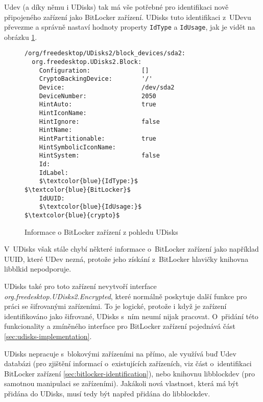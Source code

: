 Udev (a díky němu i UDisks) tak má vše potřebné pro identifikaci nově připojeného zařízení jako BitLocker zařízení. UDisks tuto identifikaci z~UDevu převezme a správně nastaví hodnoty property \texttt{IdType} a \texttt{IdUsage}, jak je vidět na obrázku \ref{fig:udisks-bitlocker-without-support}.

\begin{figure}[h]
		\centering
		\captionsetup{width=0.65\linewidth}
\begin{center}
\centering
\begin{lstlisting}[frame=none, escapechar=$, basicstyle=\ttfamily\small, columns=fullflexible, keepspaces=true, xleftmargin=.2\textwidth, xrightmargin=.2\textwidth]
/org/freedesktop/UDisks2/block_devices/sda2:
  org.freedesktop.UDisks2.Block:
    Configuration:              []
    CryptoBackingDevice:        '/'
    Device:                     /dev/sda2
    DeviceNumber:               2050
    HintAuto:                   true
    HintIconName:
    HintIgnore:                 false
    HintName:
    HintPartitionable:          true
    HintSymbolicIconName:
    HintSystem:                 false
    Id:
    IdLabel:
    $\textcolor{blue}{IdType:}$                     $\textcolor{blue}{BitLocker}$
    IdUUID:
    $\textcolor{blue}{IdUsage:}$                    $\textcolor{blue}{crypto}$
\end{lstlisting}
\end{center}
		\caption{Informace o BitLocker zařízení z pohledu UDisks}
		\label{fig:udisks-bitlocker-without-support}
\end{figure}

V~UDisks však stále chybí některé informace o~BitLocker zařízení jako například UUID, které UDev nezná, protože jeho získání z~BitLocker hlavičky knihovna libblkid nepodporuje.

UDisks také pro toto zařízení nevytvoří interface \emph{org.freedesktop.UDisks2.Encrypted}, které normálně poskytuje další funkce pro práci se šifrovanými zařízeními. To je logické, protože i když je zařízení identifikováno jako šifrované, UDisks s~ním neumí nijak pracovat. O~přidání této funkcionality a zmíněného interface pro BitLocker zařízení pojednává část \ref{sec:udisks-implementation}.

\label{sec:libblockdev}

UDisks nepracuje s~blokovými zařízeními na přímo, ale využívá buď Udev databázi (pro zjištění informací o~existujících zařízeních, viz část o~identifikaci BitLocker zařízení \ref{sec:bitlocker-identification}), nebo knihovnu libblockdev (pro samotnou manipulaci se zařízeními)\cite{Podzimek2017}. Jakákoli nová vlastnost, která má být přidána do UDisks, musí tedy být napřed přidána do libblockdev.

